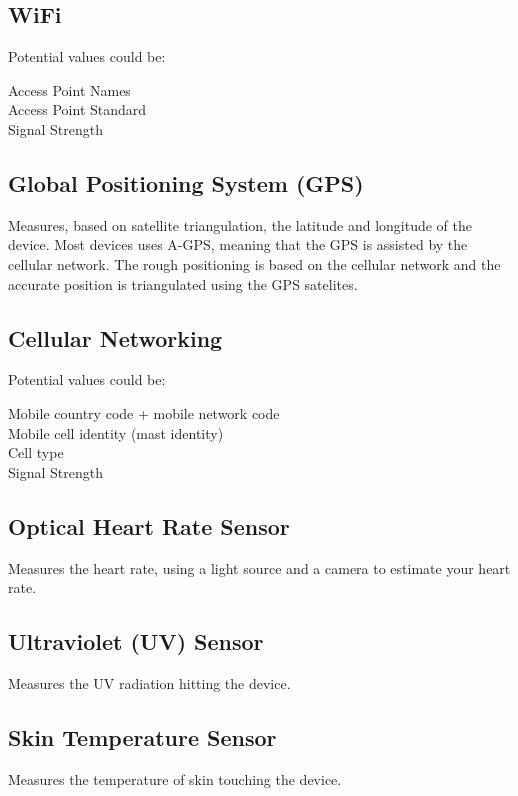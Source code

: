 \subsection{WiFi}
\label{sub:wifi}
Potential values could be: 

Access Point Names \\
Access Point Standard \\
Signal Strength

\subsection{Global Positioning System (GPS)}
\label{sub:gps}
Measures, based on satellite triangulation,  the latitude and longitude of the device. Most devices uses A-GPS, meaning that the GPS is assisted by the cellular network. The rough positioning is based on the cellular network and the accurate position is triangulated using the GPS satelites.

\subsection{Cellular Networking}
\label{sub:cellular_networking}
Potential values could be: 

Mobile country code + mobile network code \\
Mobile cell identity (mast identity) \\
Cell type  \\
Signal Strength \\


\subsection{Optical Heart Rate Sensor}
\label{sub:optical_heart_rate_sensor}
Measures the heart rate, using a light source and a camera to estimate your heart rate.

\subsection{Ultraviolet (UV) Sensor}
\label{sub:uv_sensor}
Measures the UV radiation hitting the device.

\subsection{Skin Temperature Sensor}
\label{sub:skin_temperature_sensor}
Measures the temperature of skin touching the device.

